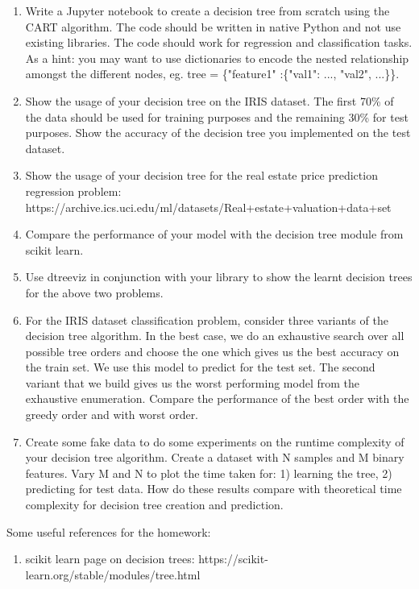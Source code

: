 \documentclass[]{article}
\begin{document}
\begin{enumerate}
	\item Write a Jupyter notebook to create a decision tree from scratch using the CART algorithm. The code should be written in native Python and not use existing libraries. The code should work for regression and classification tasks. As a hint: you may want to use dictionaries to encode the nested relationship amongst the different nodes, eg. tree = \{"feature1" :\{"val1": ..., "val2", ...\}\}.
	\item Show the usage of your decision tree on the IRIS dataset. The first 70\% of the data should be used for training purposes and the remaining 30\% for test purposes. Show the accuracy of the decision tree you implemented on the test dataset.
	\item Show the usage of your decision tree for the real estate price prediction regression problem: https://archive.ics.uci.edu/ml/datasets/Real+estate+valuation+data+set
	\item Compare the performance of your model with the decision tree module from scikit learn.
	\item Use dtreeviz in conjunction with your library to show the learnt decision trees for the above two problems.
	\item For the IRIS dataset classification problem, consider three variants of the decision tree algorithm. In the best case, we do an exhaustive search over all possible tree orders and choose the one which gives us the best accuracy on the train set. We use this model to predict for the test set. The second variant that we build gives us the worst performing model from the exhaustive enumeration. Compare the performance of the best order with the greedy order and with worst order.
	\item Create some fake data to do some experiments on the runtime complexity of your decision tree algorithm. Create a dataset with N samples and M binary features. Vary M and N to plot the time taken for: 1) learning the tree, 2) predicting for test data. How do these results compare with theoretical time complexity for decision tree creation and prediction.
	
	
	

\end{enumerate}


Some useful references for the homework:

\begin{enumerate}
	\item scikit learn page on decision trees: https://scikit-learn.org/stable/modules/tree.html
\end{enumerate}
\end{document}
